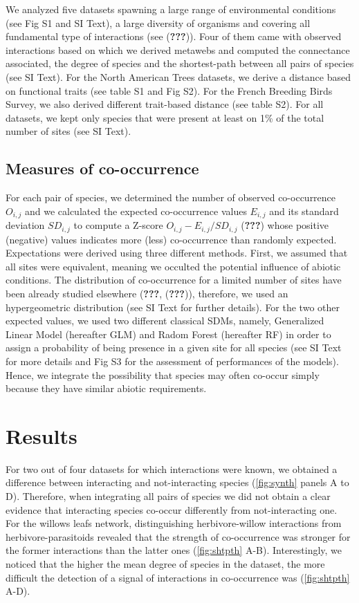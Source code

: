 We analyzed five datasets spawning a large range of environmental
conditions (see Fig S1 and SI Text), a large diversity of organisms and
covering all fundamental type of interactions (see ({\textbf{???}})).
Four of them came with observed interactions based on which we derived
metawebs and computed the connectance associated, the degree of species
and the shortest-path between all pairs of species (see SI Text). For
the North American Trees datasets, we derive a distance based on
functional traits (see table S1 and Fig S2). For the French Breeding
Birds Survey, we also derived different trait-based distance (see table
S2). For all datasets, we kept only species that were present at least
on 1\% of the total number of sites (see SI Text).

\subsection{Measures of co-occurrence}\label{measures-of-co-occurrence}

For each pair of species, we determined the number of observed
co-occurrence \(O_{i,j}\) and we calculated the expected co-occurrence
values \(E_{i,j}\) and its standard deviation \(SD_{i,j}\) to compute a
Z-score \(O_{i,j}-E_{i,j}/SD_{i,j}\) ({\textbf{???}}) whose positive
(negative) values indicates more (less) co-occurrence than randomly
expected. Expectations were derived using three different methods.
First, we assumed that all sites were equivalent, meaning we occulted
the potential influence of abiotic conditions. The distribution of
co-occurrence for a limited number of sites have been already studied
elsewhere ({\textbf{???}}, ({\textbf{???}})), therefore, we used an
hypergeometric distribution (see SI Text for further details). For the
two other expected values, we used two different classical SDMs, namely,
Generalized Linear Model (hereafter GLM) and Radom Forest (hereafter RF)
in order to assign a probability of being presence in a given site for
all species (see SI Text for more details and Fig S3 for the assessment
of performances of the models). Hence, we integrate the possibility that
species may often co-occur simply because they have similar abiotic
requirements.

\section{Results}\label{results}

For two out of four datasets for which interactions were known, we
obtained a difference between interacting and not-interacting species
(\ref{fig:synth} panels A to D). Therefore, when integrating all pairs
of species we did not obtain a clear evidence that interacting species
co-occur differently from not-interacting one. For the willows leafs
network, distinguishing herbivore-willow interactions from
herbivore-parasitoids revealed that the strength of co-occurrence was
stronger for the former interactions than the latter ones
(\ref{fig:shtpth} A-B). Interestingly, we noticed that the higher the
mean degree of species in the dataset, the more difficult the detection
of a signal of interactions in co-occurrence was (\ref{fig:shtpth} A-D).

